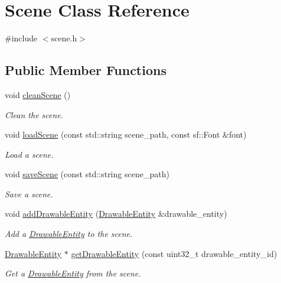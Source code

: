 \hypertarget{class_scene}{}\section{Scene Class Reference}
\label{class_scene}


{\ttfamily \#include $<$scene.\+h$>$}

\subsection*{Public Member Functions}
\begin{DoxyCompactItemize}
\item 
void \hyperlink{class_scene_a6c4a04bd6fb848a1bdf8d1a82792c1ef}{clean\+Scene} ()
\begin{DoxyCompactList}\small\item\em Clean the scene. \end{DoxyCompactList}\item 
void \hyperlink{class_scene_aca9bd4059c420909135294125b591682}{load\+Scene} (const std\+::string scene\+\_\+path, const sf\+::\+Font \&font)
\begin{DoxyCompactList}\small\item\em Load a scene. \end{DoxyCompactList}\item 
void \hyperlink{class_scene_a70c218eb67b3507a56486e1dd945f095}{save\+Scene} (const std\+::string scene\+\_\+path)
\begin{DoxyCompactList}\small\item\em Save a scene. \end{DoxyCompactList}\item 
void \hyperlink{class_scene_ad4f922487ee93dc5bf7c9ca446d05864}{add\+Drawable\+Entity} (\hyperlink{class_drawable_entity}{Drawable\+Entity} \&drawable\+\_\+entity)
\begin{DoxyCompactList}\small\item\em Add a \hyperlink{class_drawable_entity}{Drawable\+Entity} to the scene. \end{DoxyCompactList}\item 
\hyperlink{class_drawable_entity}{Drawable\+Entity} $\ast$ \hyperlink{class_scene_ab56474670cf57cc422adcbd3c4368137}{get\+Drawable\+Entity} (const uint32\+\_\+t drawable\+\_\+entity\+\_\+id)
\begin{DoxyCompactList}\small\item\em Get a \hyperlink{class_drawable_entity}{Drawable\+Entity} from the scene. \end{DoxyCompactList}\item 

\end{DoxyCompactItemize}
